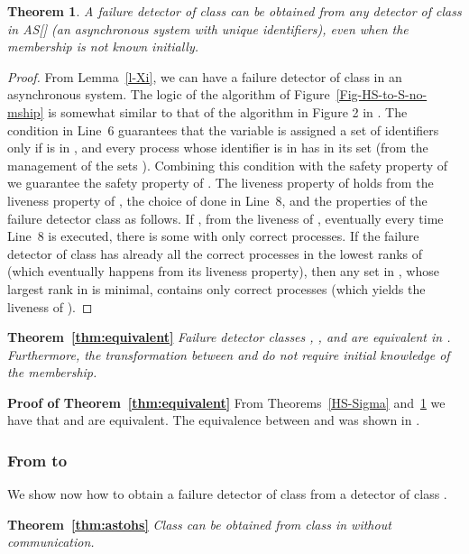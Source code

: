 \documentclass[10pt, conference, compsocconf]{IEEEtran}
\newtheorem{theorem}{Theorem}
\newcommand{\tightparagraph}[1]{\smallskip \noindent \textbf{#1} \hspace{1ex}}
\begin{document}
\begin{theorem}
\label{Sigma-HS}
A failure detector of class  can be obtained from any detector  of class  in AS[] (an asynchronous system with unique identifiers), even when the membership is not known initially.
\end{theorem}
\begin{proof}
From Lemma~\ref{l-Xi}, we can have a failure detector of class  in an asynchronous system. The logic of the algorithm of Figure~\ref{Fig-HS-to-S-no-mship} is somewhat similar to that of the algorithm in Figure 2 in \cite{DBLP:conf/wdag/BonnetR10}. The condition in Line~6 guarantees that the variable  is assigned a set of identifiers  only if  is in , and every process  whose identifier is in  has  in its set  (from the management of the sets ). Combining this condition with the safety property of  we guarantee the safety property of . The liveness property of  holds from the liveness property of , the choice of  done in Line~8, and the properties of the failure detector class  as follows. If , from the liveness of , eventually every time Line~8 is executed, there is some  with only correct processes. If the failure detector  of class  has already
all the correct processes in the lowest ranks of  (which eventually happens from its liveness property), then any set  in , whose largest rank in  is minimal, contains only correct processes (which yields the liveness of ).
\end{proof}


\tightparagraph{Theorem~\ref{thm:equivalent}}
\emph{Failure detector classes , , and  are equivalent in . Furthermore,
the transformation between  and  do not require initial knowledge of the membership.}

\tightparagraph{Proof of Theorem~\ref{thm:equivalent}}
From Theorems~\ref{HS-Sigma} and~\ref{Sigma-HS} we have that  and  are equivalent.  The equivalence between  and  was shown in \cite{DBLP:conf/wdag/BonnetR10}. 







\subsubsection{From  to }

We show now how to obtain a failure detector of class  from a detector of class .

\tightparagraph{Theorem~\ref{thm:astohs}}
\emph{Class  can be obtained from class  in  without communication.}
\end{document}
